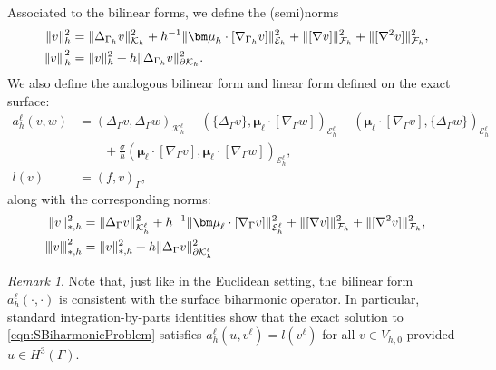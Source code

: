 \documentclass[10pt, a4paper]{amsart}
\newcommand{\p}{\partial}
\newcommand{\nab}{\nabla}
\newcommand{\bmu}{{\bm \mu}}
\newcommand{\calE}{\mathcal{E}}
\newcommand{\calF}{\mathcal{F}}
\newcommand{\calK}{\mathcal{K}}
\theoremstyle{definition}
\theoremstyle{remark}
\newtheorem{remark}[theorem]{Remark}
\theoremstyle{example}
\numberwithin{equation}{section}
\newcommand{\tbar}[1]{{\left\vert\kern-0.25ex\left\vert\kern-0.25ex\left\vert #1 
    \right\vert\kern-0.25ex\right\vert\kern-0.25ex\right\vert}}
\begin{document}
Associated to the bilinear forms, we define the (semi)norms
%
\begin{align*} %
\begin{split}
\|v\|_{h}^2
& = \|\Delta_{\Gamma_h}v\|_{\calK_h}^2 + h^{-1}\|\bmu_h \cdot [\nab_{\Gamma_h}v]\|_{\calE_h}^2+\|[\nab v]\|_{\calF_h}^2 + \|[\nab^2v]\|_{\calF_h}^2, \\
\tbar{v}_h^2 & = \|v\|_h^2 +  h \|\Delta_{\Gamma_h} v \|_{\p \calK_h}^2.
 \end{split}
\end{align*}
%
We also define the analogous bilinear form and linear form defined on the exact surface:
\begin{align*}
a_h^\ell(v, w)
& = (\Delta_{\Gamma}v, \Delta_{\Gamma}w)_{\calK_h^\ell} - (\{\Delta_{\Gamma}v\}, \bmu_{\ell} \cdot [\nab_{\Gamma}w])_{\calE^\ell_h} - (\bmu_{\ell} \cdot [\nab_{\Gamma}v], \{\Delta_{\Gamma}w\})_{\calE_h^\ell} \\
& \qquad + \frac{\sigma}{h}(\bmu_{\ell} \cdot [\nab_{\Gamma}v], \bmu_{\ell} \cdot [\nab_{\Gamma}w])_{\calE^\ell_h}, \\
l(v)
& = (f,v)_{\Gamma},
\end{align*}
along with the corresponding norms:
%
\begin{align*} %
\begin{split}
\|v\|_{*,h}^2
& = \|\Delta_{\Gamma}v\|_{\calK^\ell_h}^2 + h^{-1}\|\bmu_\ell \cdot [\nab_{\Gamma}v]\|_{\calE^\ell_h}^2+\|[\nab v]\|_{\calF_h}^2 + \|[\nab^2v]\|_{\calF_h}^2, \\
\tbar{v}_{*,h}^2 & = \|v\|_{*,h}^2 +  h \|\Delta_{\Gamma} v \|_{\p \calK^\ell_h}^2
 \end{split}
\end{align*}
\begin{remark}\label{rem:Consistent}
Note that, just like in the Euclidean setting,
the bilinear form $a_h^\ell(\cdot,\cdot)$ is consistent
with the surface biharmonic operator. In particular,
standard integration-by-parts identities 
show that the exact solution to \eqref{eqn:SBiharmonicProblem} 
satisfies  $a_h^\ell(u, v^\ell) = l(v^\ell)$ for all $v \in V_{h, 0}$ provided $u\in H^3(\Gamma)$.
\end{remark}


\end{document}
